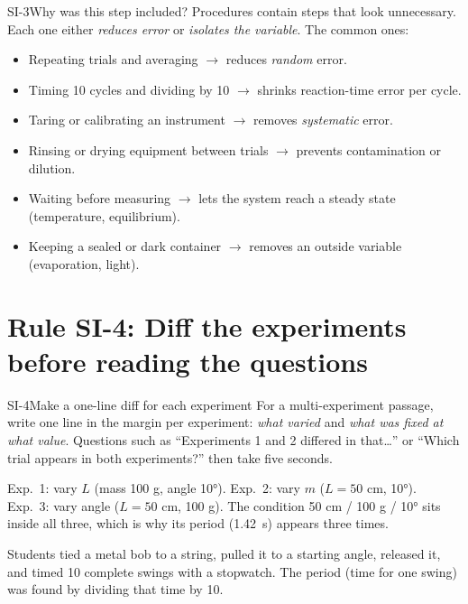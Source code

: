 \documentclass[11pt]{article}
\begin{document}
\begin{rulebox}{SI-3}{Why was this step included?}
Procedures contain steps that look unnecessary. Each one either \emph{reduces error} or \emph{isolates the variable}. The common ones:
\begin{itemize}
\item Repeating trials and averaging $\to$ reduces \emph{random} error.
\item Timing 10 cycles and dividing by 10 $\to$ shrinks reaction-time error per cycle.
\item Taring or calibrating an instrument $\to$ removes \emph{systematic} error.
\item Rinsing or drying equipment between trials $\to$ prevents contamination or dilution.
\item Waiting before measuring $\to$ lets the system reach a steady state (temperature, equilibrium).
\item Keeping a sealed or dark container $\to$ removes an outside variable (evaporation, light).
\end{itemize}
\end{rulebox}

\section{Rule SI-4: Diff the experiments before reading the questions}

\begin{rulebox}{SI-4}{Make a one-line diff for each experiment}
For a multi-experiment passage, write one line in the margin per experiment: \emph{what varied} and \emph{what was fixed at what value}. Questions such as ``Experiments 1 and 2 differed in that\ldots'' or ``Which trial appears in both experiments?'' then take five seconds.
\end{rulebox}

\begin{workedex}
Exp.\ 1: vary $L$ (mass 100 g, angle \ang{10}). Exp.\ 2: vary $m$ ($L=50$ cm, \ang{10}). Exp.\ 3: vary angle ($L=50$ cm, 100 g). The condition 50 cm / 100 g / \ang{10} sits inside all three, which is why its period (\SI{1.42}{\second}) appears three times.
\end{workedex}

Students tied a metal bob to a string, pulled it to a starting angle, released it, and timed 10 complete swings with a stopwatch. The period (time for one swing) was found by dividing that time by 10.
\end{document}

